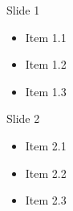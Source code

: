 \documentclass[14pt]{beamer}
\begin{document}
\begin{frame}{Slide 1}
    \begin{itemize}[<+->]
        \item Item 1.1 
        \item Item 1.2
        \item Item 1.3
    \end{itemize}
\end{frame}


\begin{frame}{Slide 2}
    \begin{itemize}[<+->]
        \item Item 2.1
        \item Item 2.2
        \item Item 2.3
    \end{itemize}
\end{frame}
\end{document}
